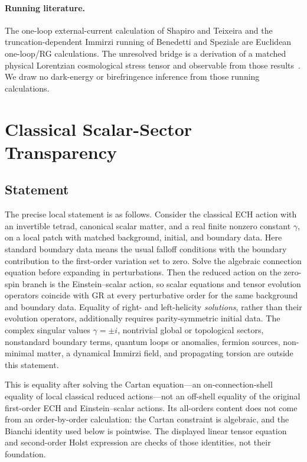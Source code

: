 \documentclass[aps,prd,twocolumn,superscriptaddress,preprintnumbers,nofootinbib,longbibliography,floatfix]{revtex4-2}
\begin{document}
\paragraph{Running literature.}
The one-loop external-current calculation of Shapiro and Teixeira and the
truncation-dependent Immirzi running of Benedetti and Speziale are Euclidean
one-loop/RG calculations.  The unresolved bridge is a derivation of a matched
physical Lorentzian cosmological stress tensor and observable from those
results~\cite{ShapiroTeixeira2014,BenedettiSpeziale2011run,Benedetti2011}.  We draw no
dark-energy or birefringence inference from those running calculations.

\section{Classical Scalar-Sector Transparency}\label{sec:transparency}

\subsection{Statement}

The precise local statement is as follows.  Consider the classical ECH action
with an invertible tetrad, canonical scalar matter, and a real finite nonzero
constant $\gamma$, on a local patch with matched background, initial, and
boundary data.  Here standard boundary data means the usual falloff conditions
with the boundary contribution to the first-order variation set to zero.
Solve the algebraic connection equation before expanding in
perturbations.  Then the reduced action on the zero-spin branch is the
Einstein--scalar action, so scalar equations and tensor evolution operators
coincide with GR at every perturbative order for the same background and
boundary data.  Equality of right- and left-helicity \emph{solutions}, rather
than their evolution operators, additionally requires parity-symmetric initial
data.  The complex singular values $\gamma=\pm i$, nontrivial global or
topological sectors, nonstandard boundary terms, quantum loops or anomalies,
fermion sources, non-minimal matter, a dynamical Immirzi field, and
propagating torsion are outside this statement.

This is equality after solving the Cartan equation---an on-connection-shell
equality of local classical reduced actions---not an off-shell equality of the
original first-order ECH and Einstein--scalar actions.  Its all-orders content
does not come from an order-by-order calculation: the Cartan constraint is
algebraic, and the Bianchi identity used below is pointwise.  The displayed
linear tensor equation and second-order Holst expression are checks of those
identities, not their foundation.
\end{document}
